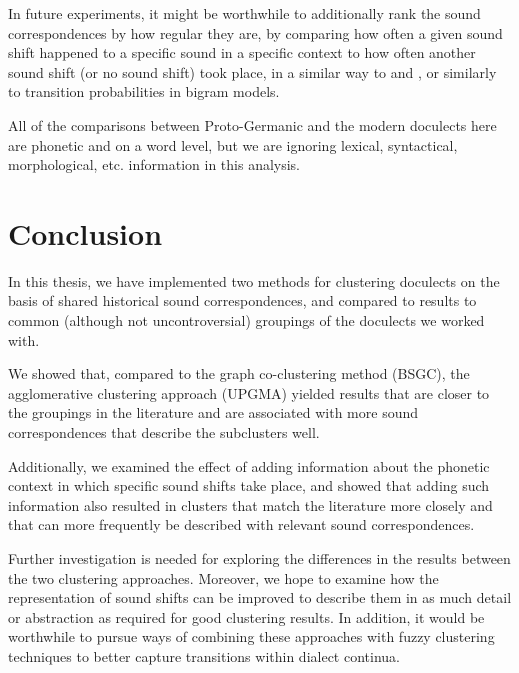 \documentclass[a4paper]{article}
\begin{document}
In future experiments, it might be worthwhile to additionally rank
the sound correspondences by how regular they are,
by comparing how often a given sound shift happened
to a specific sound in a specific context
to how often another sound shift (or no sound shift) took place,
in a similar way to \citet{prokic2007identifying} and \citet{prokic2013combining},
or similarly to transition probabilities in bigram models.

All of the comparisons between Proto-Germanic and the modern doculects
here are phonetic
and on a word level, but we are ignoring
lexical, syntactical, morphological, etc. information in this analysis.

\section{Conclusion}
\label{sec:conclusion}

In this thesis, we have implemented two methods
for clustering doculects on the basis of shared
historical sound correspondences,
and compared to results to common (although not uncontroversial)
groupings of the doculects we worked with.

We showed that, compared to the graph co-clustering method (BSGC),
the agglomerative clustering approach (UPGMA)
yielded results that are closer to the groupings in the literature
and are associated with more sound correspondences that
describe the subclusters well.

Additionally, we examined the effect of adding information about
the phonetic context in which specific sound shifts take place,
and showed that adding such information also resulted in
clusters that match the literature more closely and that
can more frequently be described with relevant sound correspondences.

Further investigation is needed for exploring the
differences in the results between the two clustering approaches.
Moreover, we hope to examine how the representation of
sound shifts can be improved to describe them in
as much detail or abstraction as required for good clustering results.
In addition, it would be worthwhile to pursue ways
of combining these approaches with fuzzy clustering techniques
to better capture transitions within dialect continua.



\end{document}
